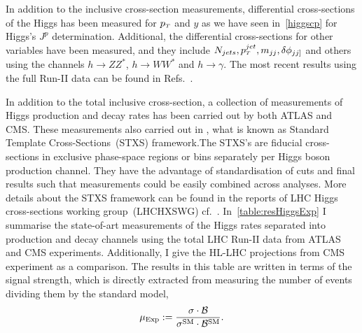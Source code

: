 \par In addition to the inclusive cross-section measurements,  differential cross-sections of the Higgs has been measured for $p_{\scriptscriptstyle T}$ and  $y$ as we have seen in~\autoref{higgscp} for Higgs's $J^p$ determination. Additional,  the differential cross-sections for other variables have been measured, and they include $N_{jets}, p_{\scriptscriptstyle T}^{jet}, m_{jj},\delta \phi_{jj]}$ and others using the channels $ h \to ZZ^*$, $h \to W W^*$ and $ h \to \gamma$. The most recent results using the full Run-II data can be found in Refs.~\cite{CMS:2018gwt,ATLAS:2019jst,ATLAS:2019mju,CMS:2019chr}.  
\par In addition to the total inclusive cross-section, a collection of measurements of Higgs production and decay rates has been carried out by both ATLAS and CMS. These measurements also carried out in , what is known as Standard Template Cross-Sections~(STXS) framework.The STXS's are fiducial cross-sections in exclusive phase-space regions or bins separately per Higgs boson production channel. They have the advantage of standardisation of cuts and final results such that measurements could be easily combined across analyses. More details about the STXS framework can be found in the reports of  LHC Higgs cross-sections working group~(LHCHXSWG) cf.~\cite{Berger:2019wnu}.  In~\autoref{table:resHiggsExp} I summarise the state-of-art measurements of the Higgs rates separated into production and decay channels using the total LHC Run-II data from ATLAS and CMS experiments. Additionally, I give the HL-LHC projections from CMS experiment as a comparison. The results in this table are written in terms of the signal strength, which is directly extracted from measuring the number of events dividing them by the standard model,
\begin{equation}
	\mu_{\mathrm{Exp}} := \frac{ \sigma \cdot \mathcal{B}}{ \sigma^{\mathrm{SM}} \cdot \mathcal{B}^{\mathrm{SM}}}.
\end{equation}
\newpage
\begingroup
 
\endgroup
\FloatBarrier
